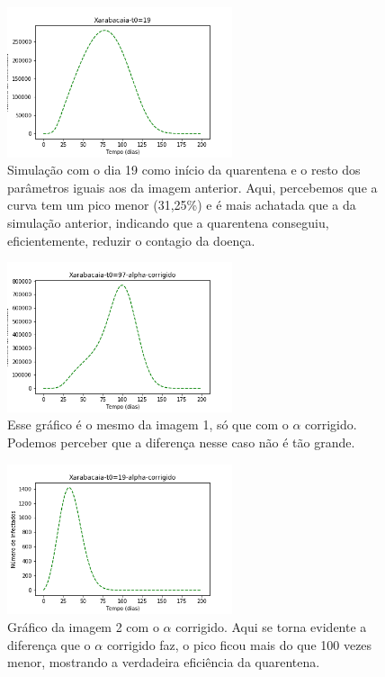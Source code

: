 \documentclass[11pt]{article}
\begin{document}
\begin{figure}[htbp]
\centering
\includegraphics[width=250px]{images/Xarabacaia-t0=19.png}
\caption{Simulação com o dia 19 como início da quarentena e o resto dos parâmetros iguais aos da imagem anterior. Aqui, percebemos que a curva tem um pico menor (31,25\%) e é mais achatada que a da simulação anterior, indicando que a quarentena conseguiu, eficientemente, reduzir o contagio da doença.}
\end{figure}

\begin{figure}[htbp]
\centering
\includegraphics[width=250px]{images/Xarabacaia-t0=97-alpha-corrigido.png}
\caption{Esse gráfico é o mesmo da imagem 1, só que com o \(\alpha\) corrigido. Podemos perceber que a diferença nesse caso não é tão grande.}
\end{figure}

\begin{figure}[htbp]
\centering
\includegraphics[width=250px]{images/Xarabacaia-t0=19-alpha-corrigido.png}
\caption{Gráfico da imagem 2 com o \(\alpha\) corrigido. Aqui se torna evidente a diferença que o \(\alpha\) corrigido faz, o pico ficou mais do que 100 vezes menor, mostrando a verdadeira eficiência da quarentena.}
\end{figure}
\newpage
\end{document}
